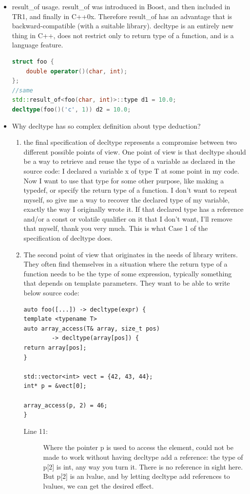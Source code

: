 \documentclass[a4paper,11pt,twoside]{book}
\begin{document}
\begin{itemize}
	\item result\_of usage. result\_of was introduced in Boost, and then included in TR1, and finally in C++0x. Therefore result\_of has an advantage that is backward-compatible (with a suitable library). decltype is an entirely new thing in C++, does not restrict only to return type of a function, and is a language feature.
\begin{lstlisting}[frame=single, language=c++]
struct foo {
	double operator()(char, int);
};
//same
std::result_of<foo(char, int)>::type d1 = 10.0;
decltype(foo()('c', 1)) d2 = 10.0;
\end{lstlisting}

\item Why decltype has so complex definition about type deduction?
\begin{enumerate}
	\item the final specification of decltype represents a compromise between two different possible points of view. One point of view is that decltype should be a way to retrieve and reuse the type of a variable as declared in the source code: I declared a variable x of type T at some point in my code. Now I want to use that type for some other purpose, like making a typedef, or specify the return type of a function. I don't want to repeat myself, so give me a way to recover the declared type of my variable, exactly the way I originally wrote it. If that declared type has a reference and/or a const or volatile qualifier on it that I don't want, I'll remove that myself, thank you very much. This is what Case 1 of the specification of decltype does.
	
	\item  The second point of view that originates in the needs of library writers. They often find themselves in a situation where the return type of a function needs to be the type of some expression, typically something that depends on template parameters. They want to be able to write below source code:
\begin{lstlisting}
auto foo([...]) -> decltype(expr) {
template <typename T>
auto array_access(T& array, size_t pos) 
		-> decltype(array[pos]) {
return array[pos];
}

std::vector<int> vect = {42, 43, 44};
int* p = &vect[0];

array_access(p, 2) = 46;
}
\end{lstlisting}
\begin{description}
	\item[Line 11:] Where the pointer p is used to access the element, could not be made to work without having decltype add a reference: the type of p[2] is int, any way you turn it. There is no reference in sight here. But p[2] is an lvalue, and by letting decltype add references to lvalues, we can get the desired effect. 
	

\end{description}
\end{enumerate}
\end{itemize}
\end{document}

